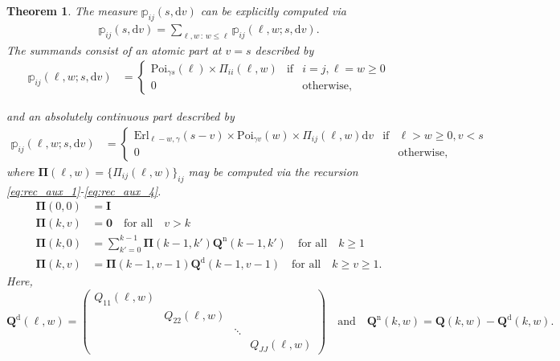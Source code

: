 \documentclass[11pt,leqno]{amsart}
\numberwithin{table}{section}
\numberwithin{figure}{section}
\numberwithin{equation}{section}
\newcommand{\dd}{\mathrm{d}}
\newcommand{\1}{{\mathds{1}}}
\newcommand{\0}{\mat{0}}
\newtheorem{theorem}[lemma]{Theorem}
\newcommand{\ap}[1]{\mathbb{#1}}
\begin{document}
\begin{theorem}\label{conditional_transitions_approx}
The measure $\ap{p}_{ij}(s, \dd v)$ can be explicitly computed via
\begin{align}\label{ltp_1}
\ap{p}_{ij}(s, \dd v) = \sum_{\ell, w\,:\, w\le \ell} \ap{p}_{ij}(\ell, w; s, \dd v).
\end{align}
The summands consist of an atomic part at $v=s$ described by 
\begin{align} \ap{p}_{ij}(\ell, w; s, \dd v)
& = \left\{\begin{array}{lll}
\mathrm{Poi}_{\gamma s}(\ell) \times \Pi_{ii}(\ell, w)&\mbox{if}& i=j, \ell=w\ge 0\\
0&&\mbox{otherwise},\end{array}\right.\label{eq:pijatom1}
\end{align}

and an absolutely continuous part described by 
\begin{align} \ap{p}_{ij}(\ell, w; s, \dd v)
& = \left\{\begin{array}{lll}
\mathrm{Erl}_{\ell-w,\gamma}(s-v) \times \mathrm{Poi}_{\gamma v} (w)\times \Pi_{ij}(\ell, w) \dd v &\mbox{if}& \ell>w\ge 0, v< s\\
0&&\mbox{otherwise},\end{array}\right.\label{eq:pijdensity}
\end{align}
where $\bm{\Pi}(\ell,w)=\{\Pi_{ij}(\ell,w)\}_{ij}$ may be computed via the recursion \eqref{eq:rec_aux_1}-\eqref{eq:rec_aux_4}.
\begin{align}
\bm{\Pi}(0,0)&=\bm{I}\label{eq:rec_aux_1}\\
\bm{\Pi}(k,v)&=\bm{0}\quad\mbox{for all}\quad v>k\label{eq:rec_aux_2}\\
\bm{\Pi}(k,0)& = \sum_{k'=0}^{k-1}  \bm{\Pi}(k-1,k')\bm{Q}^{\mathrm{n}}(k-1,k')\quad\mbox{for all}\quad k\ge 1\label{eq:rec_aux_3}\\
\bm{\Pi}(k,v)& = \bm{\Pi}(k-1,v-1)\bm{Q}^{\mathrm{d}}(k-1,v-1)\quad\mbox{for all}\quad k\ge v\ge 1.\label{eq:rec_aux_4}
\end{align}
Here, 
\[\bm{Q}^{\mathrm{d}}(\ell, w)=\begin{pmatrix} Q_{11}(\ell, w)& &&\\&Q_{22}(\ell, w)&&\\ &&\ddots& \\ &&& Q_{JJ}(\ell, w)\end{pmatrix}\quad\mbox{and}\quad \bm{Q}^{\mathrm{n}}(k, w) = \bm{Q}(k, w) - \bm{Q}^{\mathrm{d}}(k, w).\]
\end{theorem}
\end{document}
